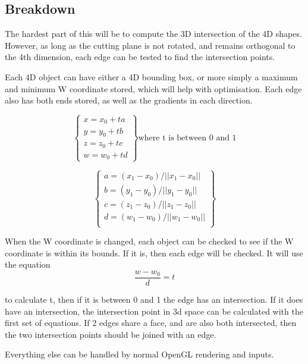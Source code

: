 \documentclass[12pt]{article}
\begin{document}
\subsection{Breakdown}
The hardest part of this will be to compute the 3D intersection of the 4D shapes.
However, as long as the cutting plane is not rotated, and remains orthogonal to the 4th dimension, each edge can be tested to find the intersection points.

Each 4D object can have either a 4D bounding box, or more simply a maximum and minimum W coordinate stored, which will help with optimisation.
Each edge also has both ends stored, as well as the gradients in each direction.

\[
   \begin{Bmatrix} 
      x = x_0 + t a \\ 
      y = y_0 + t b \\ 
      z = z_0 + t c \\
      w = w_0 + t d 
   \end{Bmatrix}
   \textrm{where t is between 0 and 1}
\]

\[
   \begin{Bmatrix} 
      a = (x_1 - x_0) / \lvert\lvert x_1-x_0 \rvert\rvert \\ 
      b = (y_1 - y_0) / \lvert\lvert y_1-y_0 \rvert\rvert \\ 
      c = (z_1 - z_0) / \lvert\lvert z_1-z_0 \rvert\rvert \\ 
      d = (w_1 - w_0) / \lvert\lvert w_1-w_0 \rvert\rvert \\ 
   \end{Bmatrix}
\]

When the W coordinate is changed, each object can be checked to see if the W coordinate is within its bounds. If it is, then each edge will be checked.
It will use the equation
\[
  \dfrac{w-w_0}{d} = t  
\]

to calculate t, then if it is between 0 and 1 the edge has an intersection.
If it does have an intersection, the intersection point in 3d space can be calculated with the first set of equations.
If 2 edges share a face, and are also both intersected, then the two intersection points should be joined with an edge.


Everything else can be handled by normal OpenGL rendering and inputs.
\end{document}
